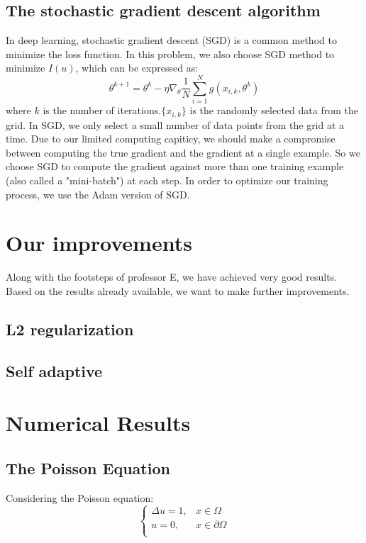 \documentclass{article}
\begin{document}
 \subsection{The stochastic gradient descent algorithm}
 In deep learning, stochastic gradient descent (SGD) is a common method to minimize the loss function. In this problem, we also choose SGD method to minimize $I(u)$, which can be expressed as:
 \begin{equation}
 \theta^{k+1}=\theta^{k}-\eta \nabla_{\theta}\frac{1}{N}\sum\limits_{i=1}^{N}g(x_{i,k},\theta^k)
 \end{equation}
 where $k$ is the number of iterations.$\{x_{i,k}\}$ is the randomly selected data from the grid. In SGD, we only select a small number of data points from the grid at a time. Due to our limited computing capiticy, we should make a compromise  between computing the true gradient and the gradient at a single example. So we choose SGD to compute the gradient against more than one training example (also called a "mini-batch") at each step. In order to optimize our training process, we use the Adam version of SGD.


\section{Our improvements}
Along with the footsteps of professor E, we have achieved very good results. Based on the results already available, we want to make further improvements. 

\subsection{L2 regularization}

\subsection{Self adaptive}


\section{Numerical Results}

\subsection{The Poisson Equation}
\par Considering the Poisson equation:
\begin{equation}
\left\{
\begin{aligned}
 \Delta u=1,& x\in \Omega \\
 u=0, &x\in \partial \Omega \\
 \end{aligned}
\right.
\end{equation}
\end{document}
